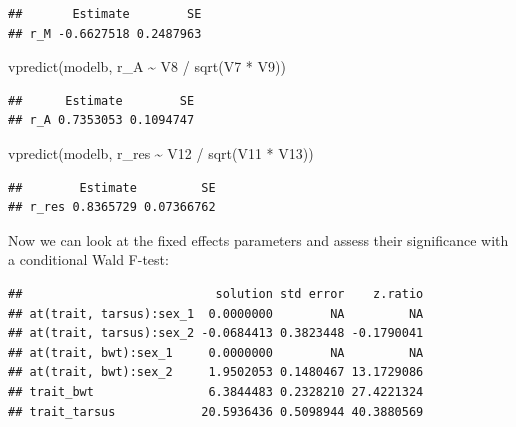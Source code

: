 \documentclass[
  12pt,
]{book}
\newenvironment{Shaded}{\begin{snugshade}}{\end{snugshade}}
\newcommand{\AttributeTok}[1]{\textcolor[rgb]{0.77,0.63,0.00}{#1}}
\newcommand{\ConstantTok}[1]{\textcolor[rgb]{0.00,0.00,0.00}{#1}}
\newcommand{\FunctionTok}[1]{\textcolor[rgb]{0.00,0.00,0.00}{#1}}
\newcommand{\NormalTok}[1]{#1}
\newcommand{\SpecialCharTok}[1]{\textcolor[rgb]{0.00,0.00,0.00}{#1}}
\newcommand{\StringTok}[1]{\textcolor[rgb]{0.31,0.60,0.02}{#1}}
\begin{document}
\begin{verbatim}
##       Estimate        SE
## r_M -0.6627518 0.2487963
\end{verbatim}

\begin{Shaded}
\begin{Highlighting}[]
\FunctionTok{vpredict}\NormalTok{(modelb, r\_A }\SpecialCharTok{\textasciitilde{}}\NormalTok{ V8 }\SpecialCharTok{/} \FunctionTok{sqrt}\NormalTok{(V7 }\SpecialCharTok{*}\NormalTok{ V9))}
\end{Highlighting}
\end{Shaded}

\begin{verbatim}
##      Estimate        SE
## r_A 0.7353053 0.1094747
\end{verbatim}

\begin{Shaded}
\begin{Highlighting}[]
\FunctionTok{vpredict}\NormalTok{(modelb, r\_res }\SpecialCharTok{\textasciitilde{}}\NormalTok{ V12 }\SpecialCharTok{/} \FunctionTok{sqrt}\NormalTok{(V11 }\SpecialCharTok{*}\NormalTok{ V13))}
\end{Highlighting}
\end{Shaded}

\begin{verbatim}
##        Estimate         SE
## r_res 0.8365729 0.07366762
\end{verbatim}

Now we can look at the fixed effects parameters and assess their significance with a conditional Wald F-test:

\begin{Shaded}
\end{Shaded}

\begin{verbatim}
##                           solution std error    z.ratio
## at(trait, tarsus):sex_1  0.0000000        NA         NA
## at(trait, tarsus):sex_2 -0.0684413 0.3823448 -0.1790041
## at(trait, bwt):sex_1     0.0000000        NA         NA
## at(trait, bwt):sex_2     1.9502053 0.1480467 13.1729086
## trait_bwt                6.3844483 0.2328210 27.4221324
## trait_tarsus            20.5936436 0.5098944 40.3880569
\end{verbatim}
\end{document}
